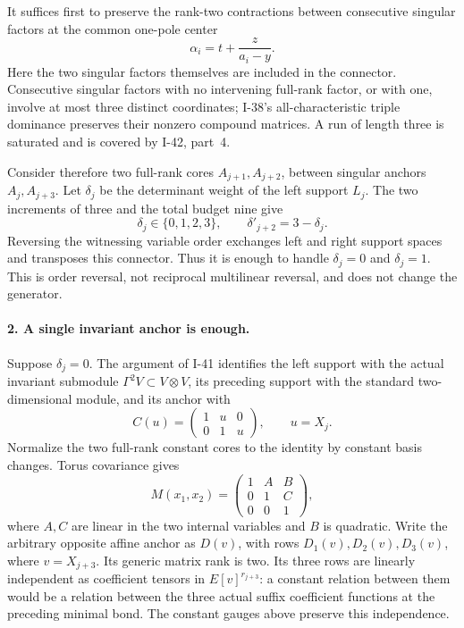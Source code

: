 It suffices first to preserve the rank-two contractions
between consecutive singular factors at the common one-pole
center
\[
 \alpha_i=t+\frac{z}{a_i-y}.
 \tag{I.159}
\]
Here the two singular factors themselves are included in the
connector. Consecutive singular factors with no intervening
full-rank factor, or with one, involve at most three distinct
coordinates; I-38's all-characteristic triple dominance
preserves their nonzero compound matrices. A run of length
three is saturated and is covered by I-42, part~4.

Consider therefore two full-rank cores $A_{j+1},A_{j+2}$,
between singular anchors $A_j,A_{j+3}$. Let $\delta_j$ be the
determinant weight of the left support $L_j$. The two increments
of three and the total budget nine give
\[
 \delta_j\in\{0,1,2,3\},\qquad
 \delta'_{j+2}=3-\delta_j.
 \tag{I.160}
\]
Reversing the witnessing variable order exchanges left and
right support spaces and transposes this connector. Thus it
is enough to handle $\delta_j=0$ and $\delta_j=1$. This is
order reversal, not reciprocal multilinear reversal, and
does not change the generator.

\paragraph{2. A single invariant anchor is enough.}
Suppose $\delta_j=0$. The argument of I-41 identifies the
left support with the actual invariant submodule
$\Gamma^2V\subset V\otimes V$, its preceding support with
the standard two-dimensional module, and its anchor with
\[
 C(u)=\begin{pmatrix}1&u&0\\0&1&u\end{pmatrix},
 \qquad u=X_j.
 \tag{I.161}
\]
Normalize the two full-rank constant cores to the identity by
constant basis changes. Torus covariance gives
\[
 M(x_1,x_2)=
 \begin{pmatrix}1&A&B\\0&1&C\\0&0&1\end{pmatrix},
 \tag{I.162}
\]
where $A,C$ are linear in the two internal variables and
$B$ is quadratic. Write the arbitrary opposite affine anchor
as $D(v)$, with rows $D_1(v),D_2(v),D_3(v)$, where
$v=X_{j+3}$. Its generic matrix rank is two. Its three rows
are linearly independent as coefficient tensors in
$E[v]^{r_{j+3}}$: a constant relation between them would be
a relation between the three actual suffix coefficient
functions at the preceding minimal bond. The constant gauges
above preserve this independence.

